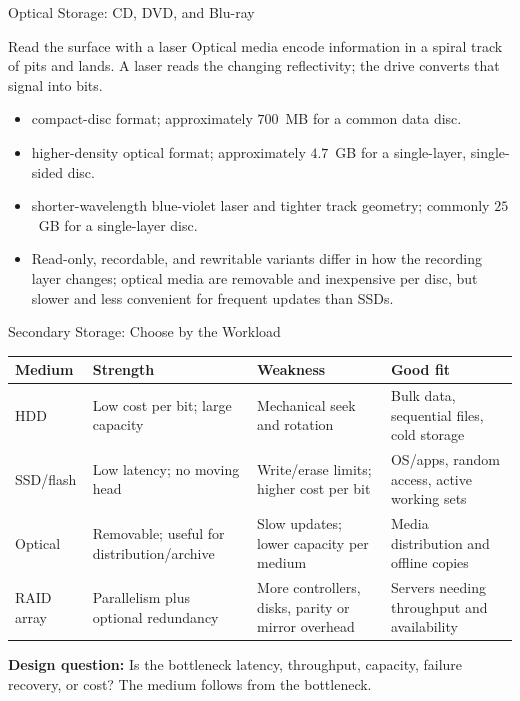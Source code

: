 \documentclass[aspectratio=169]{beamer}
\begin{document}
\begin{frame}{Optical Storage: CD, DVD, and Blu-ray}
  \begin{block}{Read the surface with a laser}
    Optical media encode information in a spiral track of pits and lands. A
    laser reads the changing reflectivity; the drive converts that signal into
    bits.
  \end{block}
  \begin{itemize}
    \item {} compact-disc format; approximately $700$~MB for a common
      data disc.
    \item {} higher-density optical format; approximately $4.7$~GB for
      a single-layer, single-sided disc.
    \item {} shorter-wavelength blue-violet laser and tighter track
      geometry; commonly $25$~GB for a single-layer disc.
    \item Read-only, recordable, and rewritable variants differ in how the
      recording layer changes; optical media are removable and inexpensive per
      disc, but slower and less convenient for frequent updates than SSDs.
  \end{itemize}
\end{frame}

\begin{frame}{Secondary Storage: Choose by the Workload}
  \scriptsize
  \begin{center}
    \begin{tabular}{@{}p{2.3cm}p{3.0cm}p{3.0cm}p{3.9cm}@{}}
      \toprule
      \textbf{Medium} & \textbf{Strength} & \textbf{Weakness} & \textbf{Good fit} \\
      \midrule
      HDD & Low cost per bit; large capacity & Mechanical seek and rotation & Bulk data, sequential files, cold storage \\
      SSD/flash & Low latency; no moving head & Write/erase limits; higher cost per bit & OS/apps, random access, active working sets \\
      Optical & Removable; useful for distribution/archive & Slow updates; lower capacity per medium & Media distribution and offline copies \\
      RAID array & Parallelism plus optional redundancy & More controllers, disks, parity or mirror overhead & Servers needing throughput and availability \\
      \bottomrule
    \end{tabular}
  \end{center}
  \vspace{0.15cm}
  \textbf{Design question:} Is the bottleneck latency, throughput, capacity, failure
  recovery, or cost? The medium follows from the bottleneck.
\end{frame}
\end{document}
